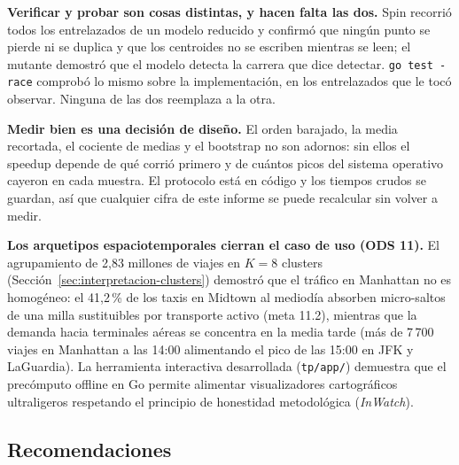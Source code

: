 \textbf{Verificar y probar son cosas distintas, y hacen falta las dos.} Spin recorrió todos los
entrelazados de un modelo reducido y confirmó que ningún punto se pierde ni se duplica y que los
centroides no se escriben mientras se leen; el mutante demostró que el modelo detecta la carrera que
dice detectar. \texttt{go test -race} comprobó lo mismo sobre la implementación, en los entrelazados
que le tocó observar. Ninguna de las dos reemplaza a la otra.

\textbf{Medir bien es una decisión de diseño.} El orden barajado, la media recortada, el cociente de
medias y el bootstrap no son adornos: sin ellos el speedup depende de qué corrió primero y de cuántos
picos del sistema operativo cayeron en cada muestra. El protocolo está en código y los tiempos crudos
se guardan, así que cualquier cifra de este informe se puede recalcular sin volver a medir.

\textbf{Los arquetipos espaciotemporales cierran el caso de uso (ODS 11).} El agrupamiento de 2{,}83
millones de viajes en $K = 8$ clusters (Sección~\ref{sec:interpretacion-clusters}) demostró que el
tráfico en Manhattan no es homogéneo: el 41{,}2\,\% de los taxis en Midtown al mediodía absorben
micro-saltos de una milla sustituibles por transporte activo (meta 11.2), mientras que la demanda hacia
terminales aéreas se concentra en la media tarde (más de 7\,700 viajes en Manhattan a las 14:00
alimentando el pico de las 15:00 en JFK y LaGuardia). La herramienta interactiva desarrollada
(\texttt{tp/app/}) demuestra que el precómputo offline en Go permite alimentar visualizadores
cartográficos ultraligeros respetando el principio de honestidad metodológica (\emph{InWatch}).

\subsection{Recomendaciones}\label{sec:recomendaciones}

